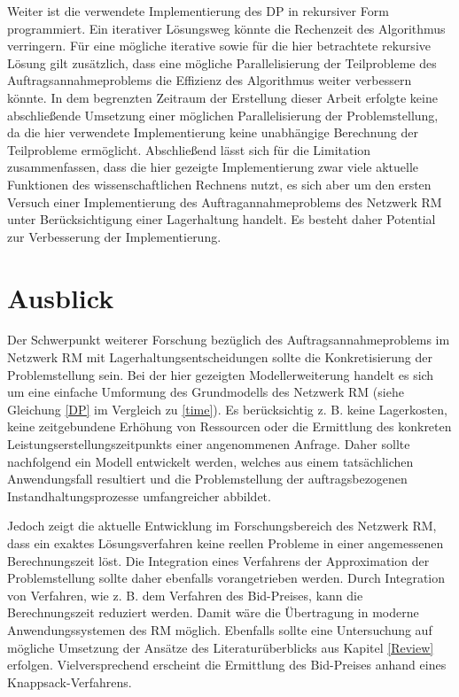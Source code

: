Weiter ist die verwendete Implementierung des DP in rekursiver Form programmiert. Ein iterativer Lösungsweg könnte die Rechenzeit des Algorithmus verringern. Für eine mögliche iterative sowie für die hier betrachtete rekursive Lösung gilt zusätzlich, dass eine mögliche Parallelisierung der Teilprobleme des Auftragsannahmeproblems die Effizienz des Algorithmus weiter verbessern könnte. In dem begrenzten Zeitraum der Erstellung dieser Arbeit erfolgte keine abschließende Umsetzung einer möglichen Parallelisierung der Problemstellung, da die hier verwendete Implementierung keine unabhängige Berechnung der Teilprobleme ermöglicht. Abschließend lässt sich für die Limitation zusammenfassen, dass die hier gezeigte Implementierung zwar viele aktuelle Funktionen des wissenschaftlichen Rechnens nutzt, es sich aber um den ersten Versuch einer Implementierung des Auftragannahmeproblems des Netzwerk RM unter Berücksichtigung einer Lagerhaltung handelt. Es besteht daher Potential zur Verbesserung der Implementierung.

\section*{Ausblick}

Der Schwerpunkt weiterer Forschung bezüglich des Auftragsannahmeproblems im Netzwerk RM mit Lagerhaltungsentscheidungen sollte die Konkretisierung der Problemstellung sein. Bei der hier gezeigten Modellerweiterung handelt es sich um eine einfache Umformung des Grundmodells des Netzwerk RM (siehe Gleichung \eqref{DP} im Vergleich zu \eqref{time}). Es berücksichtig z. B. keine Lagerkosten, keine zeitgebundene Erhöhung von Ressourcen oder die Ermittlung des konkreten Leistungserstellungszeitpunkts einer angenommenen Anfrage. Daher sollte nachfolgend ein Modell entwickelt werden, welches aus einem tatsächlichen Anwendungsfall resultiert und die Problemstellung der auftragsbezogenen Instandhaltungsprozesse umfangreicher abbildet.

Jedoch zeigt die aktuelle Entwicklung im Forschungsbereich des Netzwerk RM, dass ein exaktes Lösungsverfahren keine reellen Probleme in einer angemessenen Berechnungszeit löst. Die Integration eines Verfahrens der Approximation der Problemstellung sollte daher ebenfalls vorangetrieben werden. Durch Integration von Verfahren, wie z. B. dem Verfahren des Bid-Preises, kann die Berechnungszeit reduziert werden. Damit wäre die Übertragung in moderne Anwendungssystemen des RM möglich. Ebenfalls sollte eine Untersuchung auf mögliche Umsetzung der Ansätze des Literaturüberblicks aus Kapitel \ref{Review} erfolgen. Vielversprechend erscheint die Ermittlung des Bid-Preises anhand eines Knappsack-Verfahrens.




